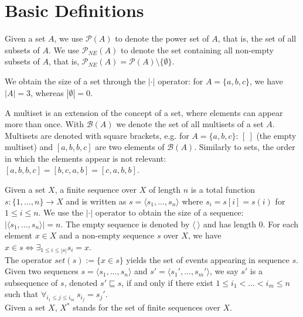 \section{Basic Definitions}

\begin{definition}
Given a set $A$, we use $\mathcal{P}(A)$ to denote the power set of $A$, that is, the set of all subsets of $A$.
We use $\mathcal{P}_{NE}(A)$ to denote the set containing all non-empty subsets of $A$, that is, $\mathcal{P}_{NE}(A)=\mathcal{P}(A) \setminus \{\emptyset \}$.

We obtain the size of a set through the $|\cdot|$ operator: for $A=\{a,b,c\}$, we have $|A| = 3$, whereas $|\emptyset|=0$.
\end{definition}


\begin{definition}[Multiset]
A multiset is an extension of the concept of a set, where elements can appear more than once. 
With $\mathcal{B}(A)$ we denote the set of all multisets of a set $A$.
Multisets are denoted with square brackets, e.g. for $A=\{a,b,c\}$: $[~]$ (the empty multiset) and $[a,b,b,c]$ are two elements of $\mathcal{B}(A)$.
Similarly to sets, the order in which the elements appear is not relevant: $[a,b,b,c] = [b,c,a,b] = [c,a,b,b]$.
\end{definition}


\begin{definition}
Given a set $X$, a finite sequence over $X$ of length $n$ is a total function $s: \{1,...,n\} \rightarrow X$ and is written as $s = \langle s_1,...,s_n \rangle$ where $s_i = s[i] = s(i)$ for $1 \leq i \leq n$.
We use the $|\cdot|$ operator to obtain the size of a sequence: $|\langle s_1,...,s_n \rangle| = n$.
The empty sequence is denoted by $\langle ~ \rangle$ and has length 0.
For each element $x \in X$ and a non-empty sequence $s$ over $X$, we have $x \in s \Leftrightarrow \exists_{1\leq i \leq |s|} s_i=x$.\\
The operator $set(s) :=\{x \in s \}$ yields the set of events appearing in sequence $s$.\\
Given two sequences $s=\langle s_1,...,s_n \rangle$ and $s'=\langle s_1',...,s_m' \rangle$, we say $s'$ is a subsequence of $s$, denoted $s' \sqsubseteq s$, if and only if there exist $1 \leq i_1 < ... < i_m \leq n$ such that $\forall_{i_1 \leq j \leq i_m} ~s_{i_j} = s_j'$. \\
Given a set $X$, $X^*$ stands for the set of finite sequences over $X$.
\end{definition}


